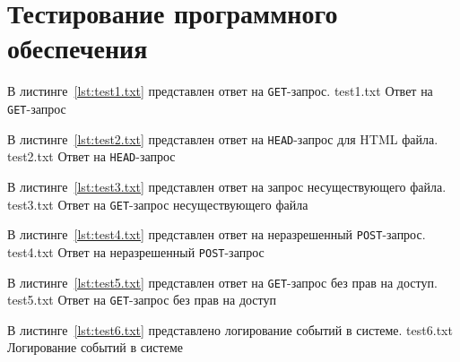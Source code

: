 \section{Тестирование программного обеспечения}

В листинге~\ref{lst:test1.txt} представлен ответ на \texttt{GET}-запрос.
	{test1.txt}
	{Ответ на \texttt{GET}-запрос}
	
В листинге~\ref{lst:test2.txt} представлен ответ на \texttt{HEAD}-запрос для HTML файла.
	{test2.txt}
	{Ответ на \texttt{HEAD}-запрос}

В листинге~\ref{lst:test3.txt} представлен ответ на запрос несуществующего файла.
	{test3.txt}
	{Ответ на \texttt{GET}-запрос несуществующего файла}

В листинге~\ref{lst:test4.txt} представлен ответ на неразрешенный \texttt{POST}-запрос.
	{test4.txt}
	{Ответ на неразрешенный \texttt{POST}-запрос}

В листинге~\ref{lst:test5.txt} представлен ответ на \texttt{GET}-запрос без прав на доступ.
	{test5.txt}
	{Ответ на \texttt{GET}-запрос без прав на доступ}
\clearpage

	В листинге~\ref{lst:test6.txt} представлено логирование событий в системе.
	{test6.txt}
	{Логирование событий в системе}